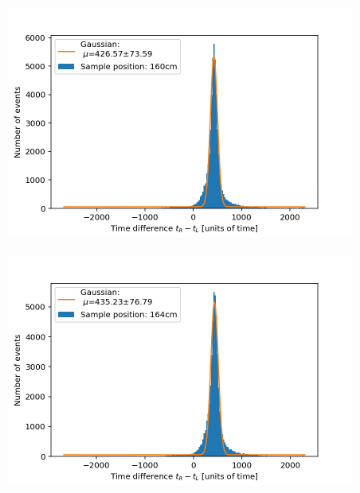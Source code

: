 \documentclass[]{article}
\begin{document}
\begin{figure}[H]
\medskip
\begin{subfigure}{0.48\textwidth}
\includegraphics[width=\linewidth]{Plots/Pos/160cm.png}
\end{subfigure}
\begin{subfigure}[c]{0.48\linewidth}
\includegraphics[width=\linewidth]{Plots/Pos/164cm.png}
\end{subfigure}


\end{figure}
\end{document}
